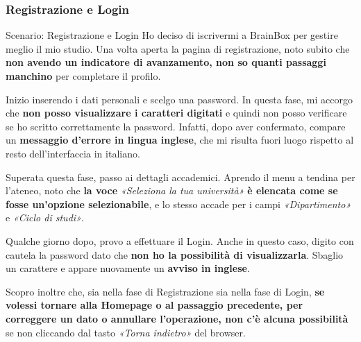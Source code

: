 \subsubsection{Registrazione e Login}

\begin{scenario}{Scenario: Registrazione e Login}
  Ho deciso di iscrivermi a BrainBox per gestire meglio il mio studio.
  Una volta aperta la pagina di registrazione, noto subito che \textbf{non avendo un indicatore di avanzamento, non so quanti
  passaggi manchino} per completare il profilo.

  Inizio inserendo i dati personali e scelgo una password. In questa fase, mi
  accorgo che \textbf{non posso visualizzare i caratteri digitati} e quindi non posso verificare se ho scritto correttamente la password. Infatti, dopo aver confermato, compare un \textbf{messaggio d'errore in lingua inglese}, che mi risulta fuori luogo
  rispetto al resto dell'interfaccia in italiano.

  Superata questa fase, passo ai dettagli accademici. Aprendo il menu a tendina
  per l'ateneo, noto che \textbf{la voce} \textit{«Seleziona la tua università»} \textbf{è
  elencata come se fosse un'opzione selezionabile}, e lo stesso accade per i
  campi \textit{«Dipartimento»} e \textit{«Ciclo di studi»}.

  Qualche giorno dopo, provo a effettuare il Login. Anche in questo caso, digito con cautela la password dato che \textbf{non ho la possibilità di visualizzarla}. Sbaglio un carattere e appare nuovamente un \textbf{avviso in inglese}.

  Scopro inoltre che, sia nella fase di Registrazione sia nella fase di Login, \textbf{se volessi tornare alla Homepage o al passaggio precedente, per correggere un dato o annullare l'operazione, non c'è alcuna possibilità} se non cliccando dal tasto \textit{«Torna indietro»} del browser.
\end{scenario}

